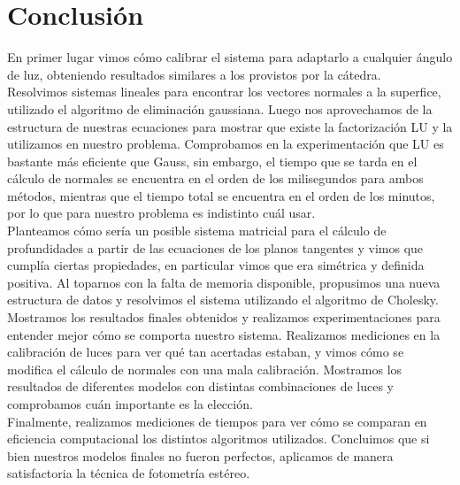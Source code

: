 \section{Conclusión}

En primer lugar vimos cómo calibrar el sistema para adaptarlo a cualquier ángulo de luz, obteniendo resultados similares a los provistos por la cátedra. \\

Resolvimos sistemas lineales para encontrar los vectores normales a la superfice, utilizado el algoritmo de eliminación gaussiana. Luego nos aprovechamos de la estructura de nuestras ecuaciones para mostrar que existe la factorización LU y la utilizamos en nuestro problema. Comprobamos en la experimentación que LU es bastante más eficiente que Gauss, sin embargo, el tiempo que se tarda en el cálculo de normales se encuentra en el orden de los milisegundos para ambos métodos, mientras que el tiempo total se encuentra en el orden de los minutos, por lo que para nuestro problema es indistinto cuál usar. \\

Planteamos cómo sería un posible sistema matricial para el cálculo de profundidades a partir de las ecuaciones de los planos tangentes y vimos que cumplía ciertas propiedades, en particular vimos que era simétrica y definida positiva. Al toparnos con la falta de memoria disponible, propusimos una nueva estructura de datos y resolvimos el sistema utilizando el algoritmo de Cholesky. \\

Mostramos los resultados finales obtenidos y realizamos experimentaciones para entender mejor cómo se comporta nuestro sistema. Realizamos mediciones en la calibración de luces para ver qué tan acertadas estaban, y vimos cómo se modifica el cálculo de normales con una mala calibración. Mostramos los resultados de diferentes modelos con distintas combinaciones de luces y comprobamos cuán importante es la elección. \\

Finalmente, realizamos mediciones de tiempos para ver cómo se comparan en eficiencia computacional los distintos algoritmos utilizados. Concluimos que si bien nuestros modelos finales no fueron perfectos, aplicamos de manera satisfactoria la técnica de fotometría estéreo. \\